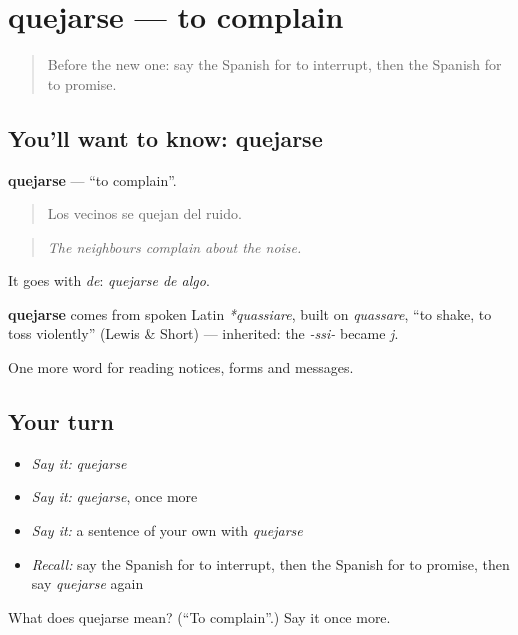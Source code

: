 \section[quejarse]{quejarse — to complain}

\label{lesson:ES-C480-quejarse}



\begin{quote}
Before the new one: say the Spanish for to interrupt, then the Spanish for to promise.
\end{quote}

\subsection*{You'll want to know: quejarse}
\textbf{quejarse} — \textquotedblleft{}to complain\textquotedblright{}.

\begin{quote}
Los vecinos se quejan del ruido.
\end{quote}

\begin{quote}
\emph{The neighbours complain about the noise.}
\end{quote}

It goes with \emph{de}: \emph{quejarse de algo}.

\begin{cousinweb}
\textbf{quejarse} comes from spoken Latin \emph{*quassiare}, built on \emph{quassare}, \textquotedblleft{}to shake, to toss violently\textquotedblright{} (Lewis \& Short) — inherited: the \emph{-ssi-} became \emph{j}.
\end{cousinweb}

\begin{grammarlens}[title={What you've built}]
One more word for reading notices, forms and messages.
\end{grammarlens}

\subsection*{Your turn}
\begin{itemize}
\raggedright
  \item \emph{Say it:} \emph{quejarse}
  \item \emph{Say it:} \emph{quejarse}, once more
  \item \emph{Say it:} a sentence of your own with \emph{quejarse}
  \item \emph{Recall:} say the Spanish for to interrupt, then the Spanish for to promise, then say \emph{quejarse} again
\end{itemize}

\begin{tcolorbox}[breakable,colback=teal!4,colframe=teal!35!black,title={Before you move on}]
What does quejarse mean? (\textquotedblleft{}To complain\textquotedblright{}.) Say it once more.
\end{tcolorbox}
